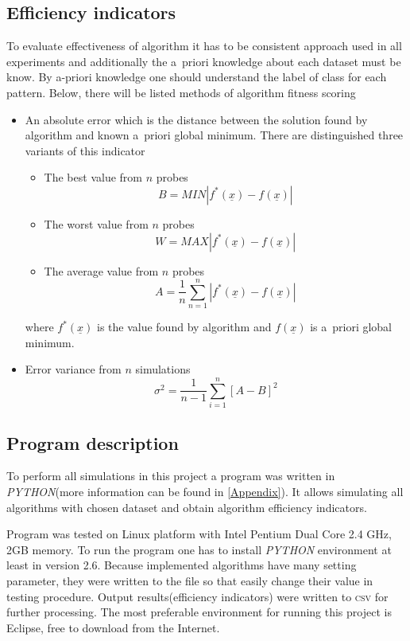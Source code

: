 \subsection{Efficiency indicators}
\label{cha:indicators}
To evaluate effectiveness of algorithm it has to be consistent approach used in
all experiments and additionally the a~priori knowledge about each dataset must
be know. By a-priori knowledge one should understand the label of class for
each pattern. Below, there will be listed methods of algorithm fitness scoring
\begin{itemize}
	\item An absolute error which is the distance between the solution found by
		algorithm and known a~priori global minimum. There are distinguished
		three variants of this indicator
		\begin{itemize}
			\item The best value from $n$ probes 
				\begin{equation}
					B=MIN\left | f^{*}(\underline{x})-f(\underline{x}) \right |
					\label{min1}
				\end{equation}
			\item The worst value from $n$ probes 
				\begin{equation}
					W=MAX\left | f^{*}(\underline{x})-f(\underline{x}) \right |
					\label{min3}
				\end{equation}
			\item The average value from $n$ probes
				\begin{equation}
					A=\frac{1}{n}\sum_{n=1}^n\left | f^{*}(\underline{x})-f(\underline{x}) \right |
					\label{min2}
				\end{equation}
		\end{itemize}
		where $f^{*}(\underline{x})$ is the value found by algorithm and
		$f(\underline{x})$ is a~priori global minimum.
	\item Error variance from $n$ simulations 
		\begin{equation}
			\sigma^2=\frac{1}{n-1}\sum_{i=1}^n\left[A-B\right]^2
			\label{min4}
		\end{equation}
\end{itemize}
\subsection{Program description}
To perform all simulations in this project a program was written in
\textit{PYTHON}(more information can be found in \ref{Appendix}). 
It allows simulating all algorithms with chosen dataset and obtain
algorithm efficiency indicators. 

Program was tested on Linux platform with Intel Pentium Dual Core 2.4 GHz, 2GB
memory. To run the program one has to install \textit{PYTHON} environment at
least in version 2.6. Because implemented algorithms have many setting parameter, 
they were written to the file so that easily change their value in testing procedure. 
Output results(efficiency indicators) were written to \textsc{csv} for further
processing. The most preferable environment for running this project is
Eclipse, free to download from the Internet.
